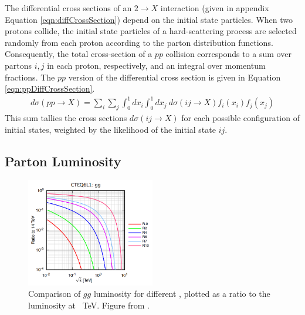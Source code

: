 The differential cross sections of an $2\to X$ interaction (given in appendix Equation \ref{eqn:diffCrossSection}) depend on the initial state particles.
When two protons collide, the initial state particles of a hard-scattering process are selected randomly from each proton according to the parton distribution functions.
Consequently, the total cross-section of a $pp$ collision corresponds to a sum over partons $i,j$ in each proton, respectively, and an integral over momentum fractions.
The $pp$ version of the differential cross section is given in Equation \ref{eqn:ppDiffCrossSection}.
\begin{equation}\begin{split}\label{eqn:ppDiffCrossSection}
d\sigma(pp\to X)=\sum_i\sum_j\int_0^1dx_i\int_0^1dx_j~d\sigma(ij\to X)f_i(x_i)f_j(x_j)
\end{split}\end{equation} 
This sum tallies the cross sections $d\sigma(ij\to X)$ for each possible configuration of initial states, weighted by the likelihood of the initial state $ij$.

\subsection{Parton Luminosity}

\begin{figure}[h!]
\captionsetup[subfigure]{position=b}
\centering
\includegraphics[width=0.5\textwidth]{figures/pheno/partonLumi.png}
\caption{Comparison of $gg$ luminosity for different \sqrts, plotted as a ratio to the luminosity at ~TeV. Figure from \cite{quigg}.}
\label{fig:partonLumi}
\end{figure}

